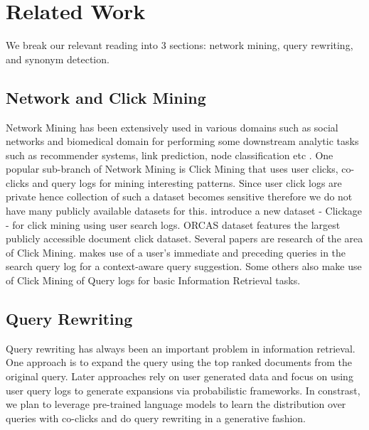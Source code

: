 \section{Related Work}
We break our relevant reading into 3 sections: network mining, query rewriting, and synonym detection. 
\subsection{Network and Click Mining}
Network Mining has been extensively used in various domains such as social networks and biomedical domain for performing some downstream analytic tasks such as recommender systems, link prediction, node classification etc \cite{FournierViger2017ASO, Ghosh2012ATR}. One popular sub-branch of Network Mining is Click Mining that uses user clicks, co-clicks and query logs for mining interesting patterns. Since user click logs are private hence collection of such a dataset becomes sensitive therefore we do not have many publicly available datasets for this. \cite{Hua2013ClickageTB} introduce a new dataset  - Clickage - for click mining using user search logs. ORCAS \cite{Craswell2020ORCAS2M} dataset features the largest publicly accessible document click dataset.  Several papers are research of the area of Click Mining. \cite{Cao2008ContextawareQS} makes use of a user's immediate and preceding queries in the search query log for a context-aware query suggestion. Some others \cite{Li2013EnhancedIR, Chuklin2013ClickMI, Kacprzak2017AQL} also make use of Click Mining of Query logs for basic Information Retrieval tasks.


\subsection{Query Rewriting}
Query rewriting has always been an important problem in information retrieval. One approach \cite{xu1996query} is to expand the query using the top ranked documents from the original query. Later approaches \cite{cui2002probabilistic, antonellis2008simrank++} rely on user generated data and focus on using user query logs to generate expansions via probabilistic frameworks. In constrast, we plan to leverage pre-trained language models to learn the distribution over queries with co-clicks and do query rewriting in a generative fashion. 
